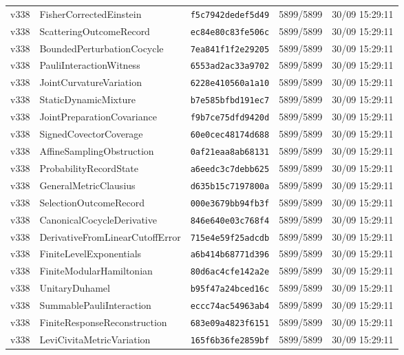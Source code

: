 \documentclass[11pt]{article}
\theoremstyle{definition}\newtheorem{deriv}{Derivation}
\begin{document}
{\begin{longtable}{@{}lllll@{}}
v338 & FisherCorrectedEinstein & \texttt{f5c7942dedef5d49} & 5899/5899 & 30/09 15:29:11 \\
v338 & ScatteringOutcomeRecord & \texttt{ec84e80c83fe506c} & 5899/5899 & 30/09 15:29:11 \\
v338 & BoundedPerturbationCocycle & \texttt{7ea841f1f2e29205} & 5899/5899 & 30/09 15:29:11 \\
v338 & PauliInteractionWitness & \texttt{6553ad2ac33a9702} & 5899/5899 & 30/09 15:29:11 \\
v338 & JointCurvatureVariation & \texttt{6228e410560a1a10} & 5899/5899 & 30/09 15:29:11 \\
v338 & StaticDynamicMixture & \texttt{b7e585bfbd191ec7} & 5899/5899 & 30/09 15:29:11 \\
v338 & JointPreparationCovariance & \texttt{f9b7ce75dfd9420d} & 5899/5899 & 30/09 15:29:11 \\
v338 & SignedCovectorCoverage & \texttt{60e0cec48174d688} & 5899/5899 & 30/09 15:29:11 \\
v338 & AffineSamplingObstruction & \texttt{0af21eaa8ab68131} & 5899/5899 & 30/09 15:29:11 \\
v338 & ProbabilityRecordState & \texttt{a6eedc3c7debb625} & 5899/5899 & 30/09 15:29:11 \\
v338 & GeneralMetricClausius & \texttt{d635b15c7197800a} & 5899/5899 & 30/09 15:29:11 \\
v338 & SelectionOutcomeRecord & \texttt{000e3679bb94fb3f} & 5899/5899 & 30/09 15:29:11 \\
v338 & CanonicalCocycleDerivative & \texttt{846e640e03c768f4} & 5899/5899 & 30/09 15:29:11 \\
v338 & DerivativeFromLinearCutoffError & \texttt{715e4e59f25adcdb} & 5899/5899 & 30/09 15:29:11 \\
v338 & FiniteLevelExponentials & \texttt{a6b414b68771d396} & 5899/5899 & 30/09 15:29:11 \\
v338 & FiniteModularHamiltonian & \texttt{80d6ac4cfe142a2e} & 5899/5899 & 30/09 15:29:11 \\
v338 & UnitaryDuhamel & \texttt{b95f47a24bced16c} & 5899/5899 & 30/09 15:29:11 \\
v338 & SummablePauliInteraction & \texttt{eccc74ac54963ab4} & 5899/5899 & 30/09 15:29:11 \\
v338 & FiniteResponseReconstruction & \texttt{683e09a4823f6151} & 5899/5899 & 30/09 15:29:11 \\
v338 & LeviCivitaMetricVariation & \texttt{165f6b36fe2859bf} & 5899/5899 & 30/09 15:29:11 \\

\end{longtable}}
\end{document}

